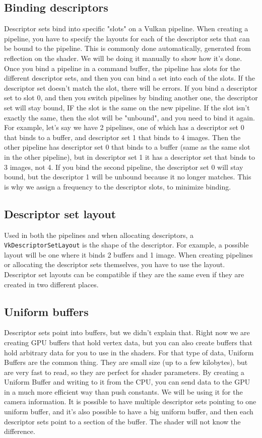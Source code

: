 \documentclass[12pt]{article}
\begin{document}
	\subsection{Binding descriptors}
	Descriptor sets bind into specific "slots" on a Vulkan pipeline. When creating a pipeline, you have to specify the layouts for each of the descriptor sets that can be bound to the pipeline. This is commonly done automatically, generated from reflection on the shader. We will be doing it manually to show how it's done. Once you bind a pipeline in a command buffer, the pipeline has slots for the different descriptor sets, and then you can bind a set into each of the slots. If the descriptor set doesn't match the slot, there will be errors. If you bind a descriptor set to slot 0, and then you switch pipelines by binding another one, the descriptor set will stay bound, IF the slot is the same on the new pipeline. If the slot isn't exactly the same, then the slot will be "unbound", and you need to bind it again. For example, let's say we have 2 pipelines, one of which has a descriptor set 0 that binds to a buffer, and descriptor set 1 that binds to 4 images. Then the other pipeline has descriptor set 0 that binds to a buffer (same as the same slot in the other pipeline), but in descriptor set 1 it has a descriptor set that binds to 3 images, not 4. If you bind the second pipeline, the descriptor set 0 will stay bound, but the descriptor 1 will be unbound because it no longer matches. This is why we assign a frequency to the descriptor slots, to minimize binding.

	\subsection{Descriptor set layout}
	Used in both the pipelines and when allocating descriptors, a \texttt{VkDescriptorSetLayout} is the shape of the descriptor. For example, a possible layout will be one where it binds 2 buffers and 1 image. When creating pipelines or allocating the descriptor sets themselves, you have to use the layout. Descriptor set layouts can be compatible if they are the same even if they are created in two different places.

	\subsection{Uniform buffers}
	Descriptor sets point into buffers, but we didn't explain that. Right now we are creating GPU buffers that hold vertex data, but you can also create buffers that hold arbitrary data for you to use in the shaders. For that type of data, Uniform Buffers are the common thing. They are small size (up to a few kilobytes), but are very fast to read, so they are perfect for shader parameters. By creating a Uniform Buffer and writing to it from the CPU, you can send data to the GPU in a much more efficient way than push constants. We will be using it for the camera information. It is possible to have multiple descriptor sets pointing to one uniform buffer, and it's also possible to have a big uniform buffer, and then each descriptor sets point to a section of the buffer. The shader will not know the difference.
\end{document}
